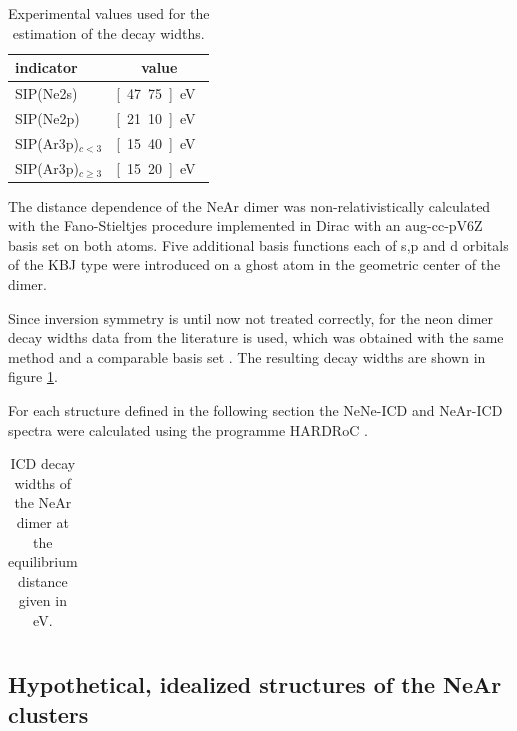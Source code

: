 \begin{table}[h]
 \caption{Experimental values used for the estimation of the decay widths.}
 \label{exp_input}
 \centering
 \begin{tabular}{lc}
  \toprule
  indicator            &  value \\
  \midrule
  SIP(Ne2s)            &  \unit[47.75]{eV} \footnotemark[1]\\
  SIP(Ne2p)            &  \unit[21.10]{eV} \footnotemark[1]\\
  SIP(Ar3p)$_{c<3}$    &  \unit[15.40]{eV} \footnotemark[1]\\
  SIP(Ar3p)$_{c\ge 3}$ &  \unit[15.20]{eV} \footnotemark[1]\\
  \bottomrule
 \end{tabular}
\end{table}

The distance dependence of the NeAr dimer was non-relativistically calculated with
the Fano-Stieltjes procedure implemented in Dirac \cite{DIRAC13,Fasshauer14_2}
with an aug-cc-pV6Z basis set on both atoms. Five additional basis functions each
of s,p and d orbitals of the
KBJ type \cite{Kaufmann89} were introduced on a ghost atom in the
geometric center of the dimer.

Since inversion symmetry is until now not treated correctly,
for the neon dimer decay widths data from the literature is used, which was
obtained with the same method and a comparable basis set \cite{Averbukh06_1}.
The resulting decay widths are shown in figure \ref{figure:fitted_NeAr_widths}.

For each structure defined in the following section the NeNe-ICD and NeAr-ICD
spectra were calculated using the programme HARDRoC \cite{HARDRoC}.


\begin{figure}[h]
 \centering
 
 \caption{}
 \label{figure:fitted_NeAr_widths}
\end{figure}


\begin{table}
 \centering
 \caption{\ac{ICD} decay widths of the NeAr dimer at the equilibrium
          distance given in eV.}
 \begin{tabular}{lcccc}
 \end{tabular}
 \label{table:compare_gamma_near}
\end{table}



\subsection{Hypothetical, idealized structures of the NeAr clusters}

